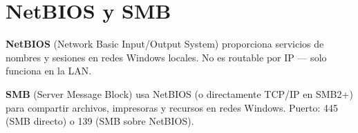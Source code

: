 \section{ NetBIOS y SMB}

\begin{concepto}
\textbf{NetBIOS} (Network Basic Input/Output System) proporciona servicios
de nombres y sesiones en redes Windows locales. No es routable por IP
--- solo funciona en la LAN.

\textbf{SMB} (Server Message Block) usa NetBIOS (o directamente TCP/IP en SMB2+)
para compartir archivos, impresoras y recursos en redes Windows.
Puerto: 445 (SMB directo) o 139 (SMB sobre NetBIOS).
\end{concepto}
